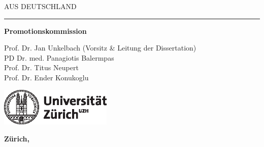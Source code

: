 \documentclass[\relativeRoot/main.tex]{subfiles}
\begin{document}
\begin{titlepage}
\begin{center}
            {\LARGE\ttfamily \MakeUppercase{\theauthor}} \vfill

            {\footnotesize AUS DEUTSCHLAND} \vspace{3cm}
            
            \rule{2cm}{0.5pt} \vspace{5mm}
            
            \textbf{Promotionskommission}

            \hspace{0.15\textwidth} \begin{minipage}{0.75\textwidth}
                Prof. Dr. Jan Unkelbach {\small (Vorsitz \& Leitung der Dissertation)}\\
                PD Dr. med. Panagiotis Balermpas\\
                Prof. Dr. Titus Neupert\\
                Prof. Dr. Ender Konukoglu
            \end{minipage} \vfill

            \includegraphics[width=0.4\textwidth]{figures/uzh_logo}
            \vfill

            \textbf{Zürich, \thedate} \vfill
                
        \end{center}
    \end{titlepage}
\end{document}
